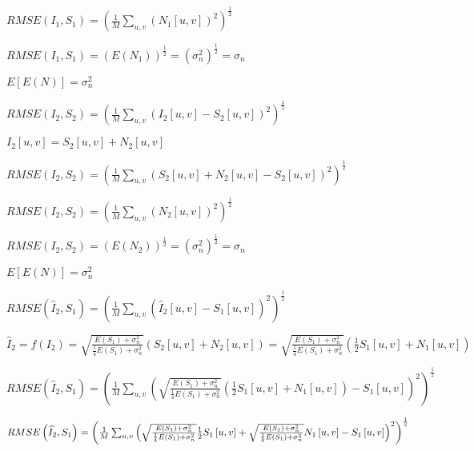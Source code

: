 \documentclass{article}
\begin{document}
$RMSE\left( I_{1},S_{1}\right) =\left( \frac{1}{M}\sum_{u,v}\left( N_{1}%
\left[ u,v\right] \right) ^{2}\right) ^{\frac{1}{2}}$

$RMSE\left( I_{1},S_{1}\right) =\left( E\left( N_{1}\right) \right) ^{\frac{1%
}{2}}=\left( \sigma _{n}^{2}\right) ^{\frac{1}{2}}=\sigma _{n}$

$E\left[ E\left( N\right) \right] =\sigma _{n}^{2}$

\vspace{1pt}

$RMSE\left( I_{2},S_{2}\right) =\left( \frac{1}{M}\sum_{u,v}\left( I_{2}%
\left[ u,v\right] -S_{2}\left[ u,v\right] \right) ^{2}\right) ^{\frac{1}{2}}$

$I_{2}\left[ u,v\right] =S_{2}\left[ u,v\right] +N_{2}\left[ u,v\right] $

$RMSE\left( I_{2},S_{2}\right) =\left( \frac{1}{M}\sum_{u,v}\left( S_{2}%
\left[ u,v\right] +N_{2}\left[ u,v\right] -S_{2}\left[ u,v\right] \right)
^{2}\right) ^{\frac{1}{2}}$

$RMSE\left( I_{2},S_{2}\right) =\left( \frac{1}{M}\sum_{u,v}\left( N_{2}%
\left[ u,v\right] \right) ^{2}\right) ^{\frac{1}{2}}$

$RMSE\left( I_{2},S_{2}\right) =\left( E\left( N_{2}\right) \right) ^{\frac{1%
}{2}}=\left( \sigma _{n}^{2}\right) ^{\frac{1}{2}}=\sigma _{n}$

$E\left[ E\left( N\right) \right] =\sigma _{n}^{2}$

\vspace{1pt}

$RMSE\left( \widehat{I}_{2},S_{1}\right) =\left( \frac{1}{M}\sum_{u,v}\left( 
\widehat{I}_{2}\left[ u,v\right] -S_{1}\left[ u,v\right] \right) ^{2}\right)
^{\frac{1}{2}}$

$\widehat{I}_{2}=f\left( I_{2}\right) =\sqrt{\frac{E\left( S_{1}\right)
+\sigma _{n}^{2}}{\frac{1}{4}E\left( S_{1}\right) +\sigma _{n}^{2}}}\left(
S_{2}\left[ u,v\right] +N_{2}\left[ u,v\right] \right) =\sqrt{\frac{E\left(
S_{1}\right) +\sigma _{n}^{2}}{\frac{1}{4}E\left( S_{1}\right) +\sigma
_{n}^{2}}}\left( \frac{1}{2}S_{1}\left[ u,v\right] +N_{1}\left[ u,v\right]
\right) $

$RMSE\left( \widehat{I}_{2},S_{1}\right) =\left( \frac{1}{M}\sum_{u,v}\left( 
\sqrt{\frac{E\left( S_{1}\right) +\sigma _{n}^{2}}{\frac{1}{4}E\left(
S_{1}\right) +\sigma _{n}^{2}}}\left( \frac{1}{2}S_{1}\left[ u,v\right]
+N_{1}\left[ u,v\right] \right) -S_{1}\left[ u,v\right] \right) ^{2}\right)
^{\frac{1}{2}}$

$RMSE\left( \widehat{I}_{2},S_{1}\right) =\left( \frac{1}{M}\sum_{u,v}\left( 
\sqrt{\frac{E\left( S_{1}\right) +\sigma _{n}^{2}}{\frac{1}{4}E\left(
S_{1}\right) +\sigma _{n}^{2}}}\frac{1}{2}S_{1}\left[ u,v\right] +\sqrt{%
\frac{E\left( S_{1}\right) +\sigma _{n}^{2}}{\frac{1}{4}E\left( S_{1}\right)
+\sigma _{n}^{2}}}N_{1}\left[ u,v\right] -S_{1}\left[ u,v\right] \right)
^{2}\right) ^{\frac{1}{2}}$
\end{document}

